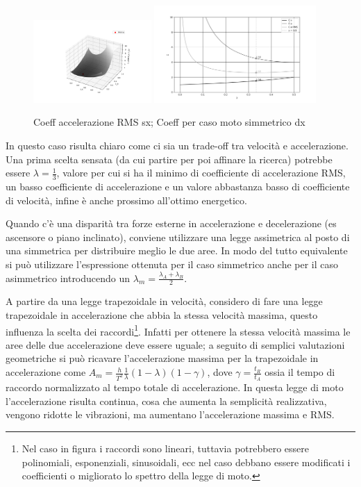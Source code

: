 \begin{figure}[h]
    \centering
    \includegraphics[width=0.4\textwidth]{Immagini/CaRMS.png}
    \includegraphics[width=0.55\textwidth]{Immagini/CvCaCaRMS.png}
    \caption{Coeff accelerazione RMS sx; Coeff per caso moto simmetrico dx}
\end{figure}

In questo caso risulta chiaro come ci sia un trade-off tra velocità e accelerazione.
Una prima scelta sensata (da cui partire per poi affinare la ricerca) potrebbe essere \(\lambda = \frac{1}{3}\), valore per cui si ha il minimo di coefficiente di accelerazione RMS, un basso coefficiente di accelerazione e un valore abbastanza basso di coefficiente di velocità, infine è anche prossimo all'ottimo energetico.

Quando c'è una disparità tra forze esterne in accelerazione e decelerazione (es ascensore o piano inclinato), conviene utilizzare una legge assimetrica al posto di una simmetrica per distribuire meglio le due aree.
In modo del tutto equivalente si può utilizzare l'espressione ottenuta per il caso simmetrico anche per il caso asimmetrico introducendo un \(\lambda_m=\frac{\lambda_A+\lambda_B}{2}\).

A partire da una legge trapezoidale in velocità, considero di fare una legge trapezoidale in accelerazione che abbia la stessa velocità massima, questo influenza la scelta dei raccordi\footnote{Nel caso in figura i raccordi sono lineari, tuttavia potrebbero essere polinomiali, esponenziali, sinusoidali, ecc nel caso debbano essere modificati i coefficienti o migliorato lo spettro della legge di moto.}.
Infatti per ottenere la stessa velocità massima le aree delle due accelerazione deve essere uguale; a seguito di semplici valutazioni geometriche si può ricavare l'accelerazione massima per la trapezoidale in accelerazione come \(A_m=\frac{h}{T^2}\frac{1}{\lambda}(1-\lambda)(1-\gamma)\), dove \(\gamma = \frac{t_R}{t_A}\) ossia il tempo di raccordo normalizzato al tempo totale di accelerazione. 
In questa legge di moto l'accelerazione risulta continua, cosa che aumenta la semplicità realizzativa, vengono ridotte le vibrazioni, ma aumentano l'accelerazione massima e RMS.


